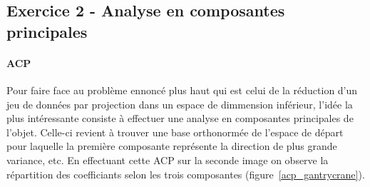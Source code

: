 \documentclass{article}
\begin{document}
\subsection{Exercice 2 - Analyse en composantes principales}
\paragraph{ACP}
Pour faire face au problème ennoncé plus haut qui est celui de la réduction d'un jeu de données par projection dans un espace de dimmension inférieur, l'idée la plus intéressante consiste à effectuer une analyse en composantes principales de l'objet. Celle-ci revient à trouver une base orthonormée de l'espace de départ pour laquelle la première composante représente la direction de plus grande variance, etc. En effectuant cette ACP sur la seconde image on observe la répartition des coefficiants selon les trois composantes (figure~\ref{acp_gantrycrane}).
\end{document}
